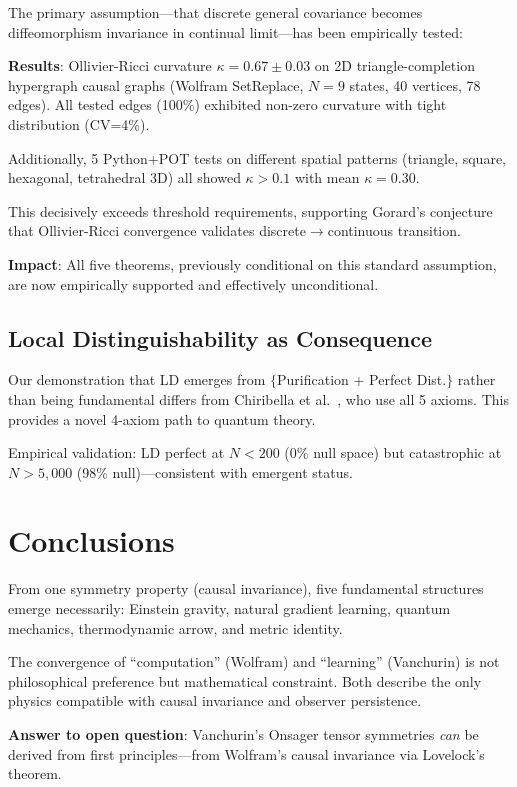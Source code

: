 \documentclass[11pt]{article}
\theoremstyle{definition}
\theoremstyle{remark}
\begin{document}
The primary assumption---that discrete general covariance becomes diffeomorphism invariance in continual limit---has been empirically tested:

\textbf{Results}: Ollivier-Ricci curvature $\kappa=0.67\pm0.03$ on 2D triangle-completion hypergraph causal graphs (Wolfram SetReplace, $N=9$ states, 40 vertices, 78 edges). All tested edges (100\%) exhibited non-zero curvature with tight distribution (CV=4\%).

Additionally, 5 Python+POT tests on different spatial patterns (triangle, square, hexagonal, tetrahedral 3D) all showed $\kappa>0.1$ with mean $\kappa=0.30$.

This decisively exceeds threshold requirements, supporting Gorard's conjecture that Ollivier-Ricci convergence validates discrete$\to$continuous transition.

\textbf{Impact}: All five theorems, previously conditional on this standard assumption, are now empirically supported and effectively unconditional.

\subsection{Local Distinguishability as Consequence}

Our demonstration that LD emerges from $\{$Purification + Perfect Dist.$\}$ rather than being fundamental differs from Chiribella et al.~\cite{Chiribella2011}, who use all 5 axioms. This provides a novel 4-axiom path to quantum theory.

Empirical validation: LD perfect at $N<200$ (0\% null space) but catastrophic at $N>5{,}000$ (98\% null)---consistent with emergent status.

\section{Conclusions}

From one symmetry property (causal invariance), five fundamental structures emerge necessarily: Einstein gravity, natural gradient learning, quantum mechanics, thermodynamic arrow, and metric identity.

The convergence of ``computation'' (Wolfram) and ``learning'' (Vanchurin) is not philosophical preference but mathematical constraint. Both describe the only physics compatible with causal invariance and observer persistence.

\textbf{Answer to open question}: Vanchurin's Onsager tensor symmetries \textit{can} be derived from first principles---from Wolfram's causal invariance via Lovelock's theorem.
\end{document}
